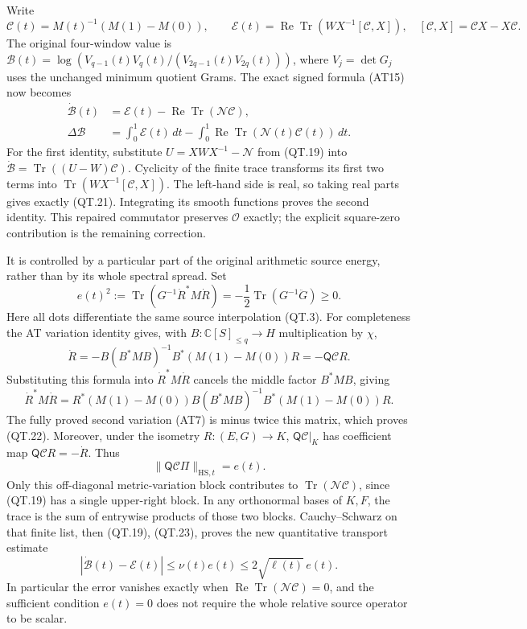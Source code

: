Write
\[
 \mathcal C(t)=M(t)^{-1}(M(1)-M(0)),\qquad
 \mathcal E(t)=\operatorname{Re}
       \operatorname{Tr}\!\left(WX^{-1}[\mathcal C,X]\right),
 \quad [\mathcal C,X]=\mathcal CX-X\mathcal C.
 \tag{QT.20}\label{eq:qt-correctedintegrand}
\]
The original four-window value is
\(\mathcal B(t)=\log(V_{q-1}(t)V_q(t)/(V_{2q-1}(t)V_{2q}(t)))\),
where \(V_j=\det G_j\) uses the unchanged minimum quotient Grams.
The exact signed formula (AT15) now becomes
\[
 \begin{split}
 \dot{\mathcal B}(t)
 &=\mathcal E(t)-\operatorname{Re}\operatorname{Tr}
                                      (\mathcal N\mathcal C),\\
 \Delta\mathcal B
 &=\int_0^1\mathcal E(t)\,dt
       -\int_0^1\operatorname{Re}\operatorname{Tr}
                                      (\mathcal N(t)\mathcal C(t))\,dt.
 \end{split}
 \tag{QT.21}\label{eq:qt-signedexact}
\]
For the first identity, substitute
\(U=XWX^{-1}-\mathcal N\) from (QT.19) into
\(\dot{\mathcal B}=\operatorname{Tr}((U-W)\mathcal C)\).
Cyclicity of the finite trace transforms its first two terms into
\(\operatorname{Tr}(WX^{-1}[\mathcal C,X])\).
The left-hand side is real, so taking real parts gives exactly (QT.21).
Integrating its smooth functions proves the second identity.
This repaired commutator preserves \(\mathcal O\) exactly; the
explicit square-zero contribution is the remaining correction.

It is controlled by a particular part of the original arithmetic
source energy, rather than by its whole spectral spread. Set
\[
 e(t)^2
 :=\operatorname{Tr}\!\left(G^{-1}\dot R^*M\dot R\right)
 =-\frac12\operatorname{Tr}(G^{-1}\ddot G)\ge0.
 \tag{QT.22}\label{eq:qt-speed}
\]
Here all dots differentiate the same source interpolation (QT.3).
For completeness the AT variation identity gives, with
\(B:\mathbb C[S]_{\le q}\to H\) multiplication by \(\chi\),
\[
 \dot R=-B(B^*MB)^{-1}B^*(M(1)-M(0))R
       =-\mathsf Q\mathcal C R.
 \]
Substituting this formula into \(\dot R^*M\dot R\) cancels the
middle factor \(B^*MB\), giving
\[
 \dot R^*M\dot R
 =R^*(M(1)-M(0))B(B^*MB)^{-1}B^*(M(1)-M(0))R.
 \]
The fully proved second variation (AT7) is minus twice this matrix,
which proves (QT.22).
Moreover, under the isometry \(R:(E,G)\to K\),
\(\mathsf Q\mathcal C|_K\) has coefficient map
\(\mathsf Q\mathcal C R=-\dot R\). Thus
\[
 \|\mathsf Q\mathcal C\Pi\|_{\mathrm{HS},t}=e(t).
 \tag{QT.23}\label{eq:qt-crossspeed}
\]
Only this off-diagonal metric-variation block contributes to
\(\operatorname{Tr}(\mathcal N\mathcal C)\), since (QT.19) has a
single upper-right block. In any orthonormal bases of \(K,F\),
the trace is the sum of entrywise products of those two blocks.
Cauchy--Schwarz on that finite list, then (QT.19), (QT.23), proves
the new quantitative transport estimate
\[
 \boxed{\;
 |\dot{\mathcal B}(t)-\mathcal E(t)|
       \le\nu(t)e(t)\le2\sqrt{\ell(t)}\,e(t).
 \;}
 \tag{QT.24}\label{eq:qt-localbound}
\]
In particular the error vanishes exactly when
\(\operatorname{Re}\operatorname{Tr}(\mathcal N\mathcal C)=0\),
and the sufficient condition \(e(t)=0\)
does not require the whole relative source operator to be scalar.


